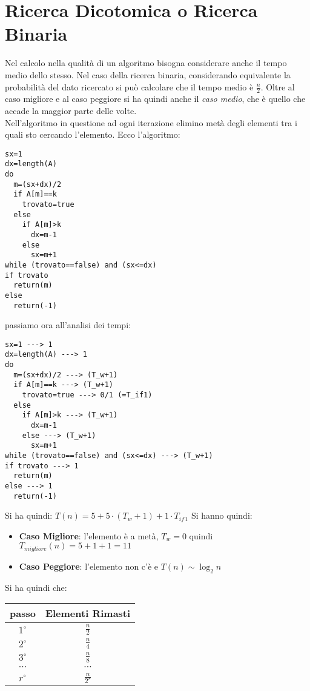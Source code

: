 \documentclass[a4paper,12pt,oneside,tikz]{book}
\begin{document}
\section{Ricerca Dicotomica o Ricerca Binaria}
Nel calcolo nella qualità di un algoritmo bisogna considerare anche il tempo medio dello stesso. Nel caso della ricerca binaria, considerando equivalente la probabilità del dato ricercato si può calcolare che il tempo medio è $\frac{n}{2}$. Oltre al caso migliore e al caso peggiore si ha quindi anche il \textit{caso medio}, che è quello che accade la maggior parte delle volte.\\
Nell'algoritmo in questione ad ogni iterazione elimino metà degli elementi tra i quali sto cercando l'elemento.
Ecco l'algoritmo:
\begin{verbatim}
sx=1
dx=length(A)
do
  m=(sx+dx)/2
  if A[m]==k
    trovato=true
  else 
    if A[m]>k
      dx=m-1
    else 
      sx=m+1
while (trovato==false) and (sx<=dx)
if trovato
  return(m)
else
  return(-1)
\end{verbatim}
\newpage
passiamo ora all'analisi dei tempi:
\begin{verbatim}
sx=1 ---> 1
dx=length(A) ---> 1
do
  m=(sx+dx)/2 ---> (T_w+1)
  if A[m]==k ---> (T_w+1)
    trovato=true ---> 0/1 (=T_if1)
  else 
    if A[m]>k ---> (T_w+1)
      dx=m-1
    else ---> (T_w+1)
      sx=m+1
while (trovato==false) and (sx<=dx) ---> (T_w+1)
if trovato ---> 1
  return(m)
else ---> 1
  return(-1)
\end{verbatim}
Si ha quindi: $T(n)=5+5\cdot (T_w +1)+1\cdot T_{if\,1}$
Si hanno quindi:
\begin{itemize}
	\item \textbf{Caso Migliore}: l'elemento è a metà, $T_w=0$ quindi $T_{migliore}(n)=5+1+1=11$
	\item \textbf{Caso Peggiore}: l'elemento non c'è e $T(n)\sim\log_2 n$
\end{itemize}
Si ha quindi che:\\
\begin{center}
	\begin{tabular}{|c|c|}
		\hline
		\textbf{passo} & \textbf{Elementi Rimasti} \\ \hline
		$1^{\circ}$    & $\frac{n}{2}$             \\ \hline
		$2^{\circ}$    & $\frac{n}{4}$             \\ \hline
		$3^{\circ}$    & $\frac{n}{8}$             \\ \hline
		$\cdots$       & $\cdots$                  \\ \hline
		$r^{\circ}$    & $\frac{n}{2^r}$           \\ \hline
	\end{tabular}
\end{center}
\end{document}
